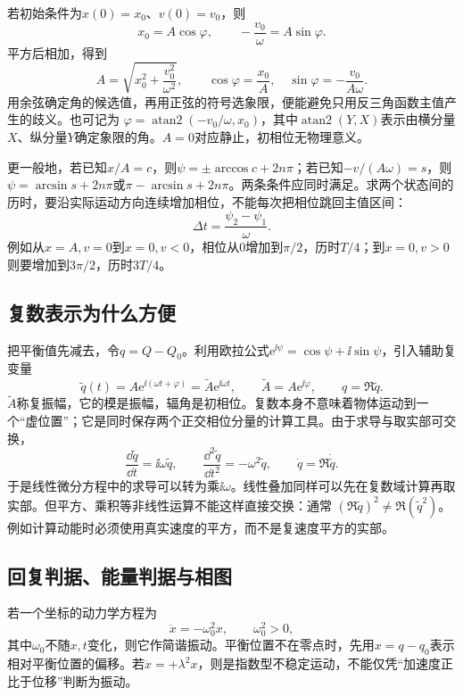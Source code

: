 若初始条件为$x(0)=x_0$、$v(0)=v_0$，则
\[
 x_0=A\cos\varphi,\qquad -\frac{v_0}{\omega}=A\sin\varphi.
\]
平方后相加，得到
\begin{equation}\label{ch10:eq:initial}
 A=\sqrt{x_0^2+\frac{v_0^2}{\omega^2}},\qquad
 \cos\varphi=\frac{x_0}{A},\quad \sin\varphi=-\frac{v_0}{A\omega}.
\end{equation}
用余弦确定角的候选值，再用正弦的符号选象限，便能避免只用反三角函数主值产生的歧义。也可记为
$\varphi=\operatorname{atan2}(-v_0/\omega,x_0)$，其中$\operatorname{atan2}(Y,X)$表示由横分量$X$、纵分量$Y$确定象限的角。$A=0$对应静止，初相位无物理意义。

更一般地，若已知$x/A=c$，则$\psi=\pm\arccos c+2n\pi$；若已知$-v/(A\omega)=s$，则$\psi=\arcsin s+2n\pi$或$\pi-\arcsin s+2n\pi$。两条条件应同时满足。求两个状态间的历时，要沿实际运动方向连续增加相位，不能每次把相位跳回主值区间：
\begin{equation}\label{ch10:eq:phase-time}
 \Delta t=\frac{\psi_2-\psi_1}{\omega}.
\end{equation}
例如从$x=A,v=0$到$x=0,v<0$，相位从0增加到$\pi/2$，历时$T/4$；到$x=0,v>0$则要增加到$3\pi/2$，历时$3T/4$。

\subsection{复数表示为什么方便}
把平衡值先减去，令$q=Q-Q_0$。利用欧拉公式$\mathrm e^{\ii\psi}=\cos\psi+\ii\sin\psi$，引入辅助复变量
\[
 \widetilde q(t)=A\mathrm e^{\ii(\omega t+\varphi)}
 =\widetilde A\mathrm e^{\ii\omega t},\qquad
 \widetilde A=A\mathrm e^{\ii\varphi},\qquad q=\Re\widetilde q.
\]
$\widetilde A$称复振幅，它的模是振幅，辐角是初相位。复数本身不意味着物体运动到一个“虚位置”；它是同时保存两个正交相位分量的计算工具。由于求导与取实部可交换，
\[
 \frac{\dd\widetilde q}{\dd t}=\ii\omega\widetilde q,
 \qquad \frac{\dd^2\widetilde q}{\dd t^2}=-\omega^2\widetilde q,
 \qquad \dot q=\Re\dot{\widetilde q}.
\]
于是线性微分方程中的求导可以转为乘$\ii\omega$。线性叠加同样可以先在复数域计算再取实部。但平方、乘积等非线性运算不能这样直接交换：通常
$(\Re\widetilde q)^2\ne\Re(\widetilde q^{2})$。例如计算动能时必须使用真实速度的平方，而不是复速度平方的实部。

\subsection{回复判据、能量判据与相图}
若一个坐标的动力学方程为
\begin{equation}\label{ch10:eq:linear-test}
 \ddot x=-\omega_0^2x,\qquad\omega_0^2>0,
\end{equation}
其中$\omega_0$不随$x,t$变化，则它作简谐振动。平衡位置不在零点时，先用$x=q-q_0$表示相对平衡位置的偏移。若$\ddot x=+\lambda^2x$，则是指数型不稳定运动，不能仅凭“加速度正比于位移”判断为振动。

